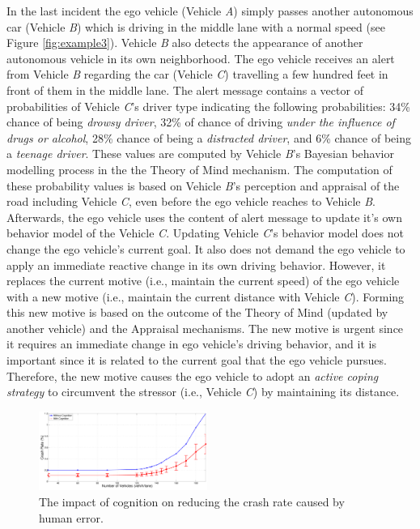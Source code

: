 \documentclass[journal, 11pt]{IEEEtran}
\begin{document}
In the last incident the ego vehicle (Vehicle \textit{A}) simply passes another
autonomous car (Vehicle \textit{B}) which is driving in the middle lane with a
normal speed (see Figure \ref{fig:example3}). Vehicle \textit{B} also detects
the appearance of another autonomous vehicle in its own neighborhood. The ego
vehicle receives an alert from Vehicle \textit{B} regarding the car (Vehicle
\textit{C}) travelling a few hundred feet in front of them in the middle lane.
The alert message contains a vector of probabilities of Vehicle \textit{C}'s
driver type indicating the following probabilities: 34\% chance of being
\textit{drowsy driver}, 32\% of chance of driving \textit{under the influence of
drugs or alcohol}, 28\% chance of being a \textit{distracted driver}, and 6\%
chance of being a \textit{teenage driver}. These values are computed by 
Vehicle \textit{B}'s Bayesian behavior modelling process in the the Theory of
Mind mechanism. The computation of these probability values is based on Vehicle
\textit{B}'s perception and appraisal of the road including Vehicle \textit{C},
even before the ego vehicle reaches to Vehicle \textit{B}. Afterwards, the ego
vehicle uses the content of alert message to update it's own behavior model
of the Vehicle \textit{C}. Updating Vehicle \textit{C}'s behavior model does not
change the ego vehicle's current goal. It also does not demand the ego vehicle
to apply an immediate reactive change in its own driving behavior. However, it
replaces the current motive (i.e., maintain the current speed) of the ego
vehicle with a new motive (i.e., maintain the current distance with Vehicle
\textit{C}). Forming this new motive is based on the outcome of the Theory of
Mind (updated by another vehicle) and the Appraisal mechanisms. The new motive
is urgent since it requires an immediate change in ego vehicle's driving
behavior, and it is important since it is related to the current goal that the
ego vehicle pursues. Therefore, the new motive causes the ego vehicle to adopt
an \textit{active coping strategy} to circumvent the stressor (i.e., Vehicle
\textit{C}) by maintaining its distance.

\begin{figure}[tbh]
  \centering
  \vspace*{1mm}
  \includegraphics[width=0.49\textwidth]{figs/errorPlot.pdf}
  \caption{{\fontsize{10}{10}\selectfont The impact of cognition on reducing the
  crash rate caused by human error.}}
  \label{fig:errorPlot}
  \vspace*{-6mm}
\end{figure}
\end{document}
